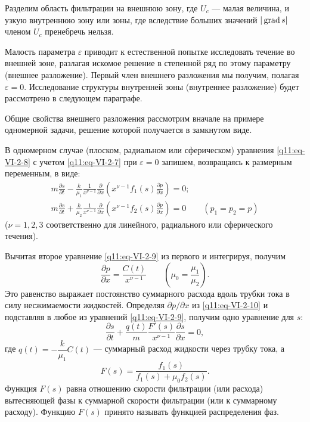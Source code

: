Разделим область фильтрации на внешнюю зону, где $U_c$ --- малая величина, и узкую внутреннюю зону или зоны, где вследствие больших значений $|\operatorname{grad} s|$ членом $U_c$ пренебречь нельзя.

Малость параметра $\varepsilon$ приводит к естественной попытке исследовать течение во внешней зоне, разлагая искомое решение в степенной ряд по этому параметру (внешнее разложение). Первый член внешнего разложения мы получим, полагая $\varepsilon=0$. Исследование структуры внутренней зоны (внутреннее разложение) будет рассмотрено в следующем параграфе.

Общие свойства внешнего разложения рассмотрим вначале на примере одномерной задачи, решение которой получается в замкнутом виде.

В одномерном случае (плоском, радиальном или сферическом)
уравнения \eqref{q11:eq-VI-2-8} с учетом \eqref{q11:eq-VI-2-7} при $\varepsilon=0$ запишем, возвращаясь к размерным переменным, в виде:
\begin{equation}\begin{gathered}
m\frac{\partial s}{\partial t}-\frac{k}{\mu_1}\frac{1}{x^{\nu-1}}\frac{\partial}{\partial x}\left(x^{\nu-1}f_1(s)\frac{\partial p}{\partial x}\right)=0;\\
m\frac{\partial s}{\partial t}+\frac{k}{\mu_2}\frac{1}{x^{\nu-1}}\frac{\partial}{\partial x}\left(x^{\nu-1}f_2(s)\frac{\partial p}{\partial x}\right)=0\qquad(p_1=p_2=p)
\end{gathered}\tag{VI.2.9}\label{q11:eq-VI-2-9}\end{equation}
($\nu=1,2,3$ соответственно для линейного, радиального или сферического течения).

Вычитая второе уравнение \eqref{q11:eq-VI-2-9} из первого и интегрируя, получим
\begin{equation}[f_1(s)+\mu_0f_2(s)]\frac{\partial p}{\partial x}=\frac{C(t)}{x^{\nu-1}}\qquad\left(\mu_0=\frac{\mu_1}{\mu_2}\right).\tag{VI.2.10}\label{q11:eq-VI-2-10}\end{equation}
Это равенство выражает постоянство суммарного расхода вдоль трубки тока в силу несжимаемости жидкостей. Определяя $\partial p/\partial x$ из \eqref{q11:eq-VI-2-10} и подставляя в любое из уравнений \eqref{q11:eq-VI-2-9}, получим одно уравнение для $s$:
\begin{equation}\frac{\partial s}{\partial t}+\frac{q(t)}{m}\frac{F'(s)}{x^{\nu-1}}\frac{\partial s}{\partial x}=0,\tag{VI.2.11}\label{q11:eq-VI-2-11}\end{equation}
где $q(t)=-\dfrac{k}{\mu_1}C(t)$ --- суммарный расход жидкости через трубку тока, а
\[F(s)=\frac{f_1(s)}{f_1(s)+\mu_0f_2(s)}.\]
Функция $F(s)$ равна отношению скорости фильтрации (или расхода) вытесняющей фазы к суммарной скорости фильтрации (или к суммарному расходу). Функцию $F(s)$ принято называть функцией распределения фаз.

